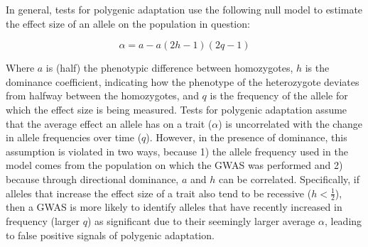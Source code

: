 \documentclass[a4paper,10pt]{article}
\newcommand{\jb}[1]{{\color{blue} (#1)} }
\begin{document}
\begin{comment}
  Ok, this is getting close, but I think there are still a couple things to unwind here.
  The second equation below is not really a feature of tests of polygenic adaptation, but rather is just a fact about the way that the average effect size depends on the difference between homozygotes, dominance, and the current allele frequency in the population. Above, you've already motivated the fact that tests of polygenic adaptation assume independence of the average effect and patterns of change in allele frequency. Now I think before you get to equation 2 you want to introduce the idea of dominance (you haven't done that up to this point), i.e. when the effect of an allele on a phentoype depends on the identity of the other allele at that site, and then you can say that the presence of dominance violates this assumption of independence between allele frequency and average effect. Then show the equation and explain what the individual pieces are.
  \end{comment}


In general, tests for polygenic adaptation use the following null model to
estimate the effect size of an allele on the population in question:

\begin{equation}
  \alpha = a - a(2h - 1)(2q - 1)
\end{equation}

Where $a$ is \jb{half} the phenotypic difference between homozygotes, $h$ is the
dominance coefficient, indicating how the phenotype of the heterozygote deviates from halfway between the homozygotes, and $q$ is the frequency of the allele for which
the effect size is being measured. Tests for polygenic adaptation
assume that the average effect an allele has on a trait ($\alpha$) is
uncorrelated with the change in allele frequencies over time
($q$). However, in the presence of dominance, this assumption is violated in two ways, because 1)
the allele frequency used in the model comes from the population on
which the GWAS was performed and 2) because through directional
dominance, $a$ and $h$ can be correlated. Specifically, if alleles that
increase the effect size of a trait also tend to be recessive
($h<\frac{1}{2}$), then a GWAS is more likely to identify alleles that have
recently increased in frequency (larger $q$) as significant due to
their seemingly larger average $\alpha$, leading to false
positive signals of polygenic adaptation.
\end{document}
